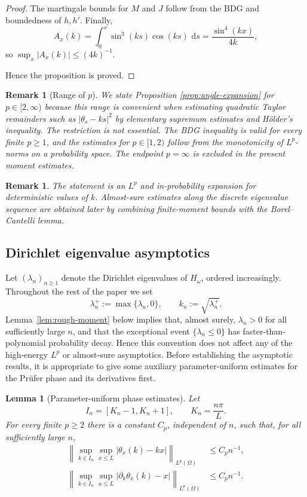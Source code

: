 \documentclass[11pt]{article}
\newtheorem{lemma}[theorem]{Lemma}
\newtheorem{remark}[theorem]{Remark}
\newcommand{\dd}{\,\mathrm d}
\begin{document}
\begin{proof}
The martingale bounds for $M$ and $J$ follow from the BDG and boundedness of $h,h'$.
Finally,
\[
    A_x(k)=\int_0^x\sin^3(ks)\cos(ks)\,\dd s
    =\frac{\sin^4(kx)}{4k},
\]
so $\sup_x|A_x(k)|\le(4k)^{-1}$. 

Hence the proposition is proved.
\end{proof}

\begin{remark}[Range of $p$]\label{rem:p-range}
We state Proposition \ref{prop:angle-expansion} for $p\in[2,\infty)$ because this range is convenient when estimating quadratic Taylor remainders such as $|\theta_s-ks|^2$ by elementary supremum estimates and H\"older's inequality. The restriction is not essential. The BDG inequality is valid for every finite $p\ge1$, and the estimates for $p\in[1,2)$ follow from the monotonicity of $L^p$-norms on a probability space. The endpoint $p=\infty$ is excluded in the present moment estimates.
\end{remark}

\begin{remark}
The statement is an $L^p$ and in-probability expansion for deterministic values of $k$. Almost-sure estimates along the discrete eigenvalue sequence are obtained later by combining finite-moment bounds with the Borel--Cantelli lemma.
\end{remark}

\subsection{Dirichlet eigenvalue asymptotics}

Let $(\lambda_n)_{n\ge1}$ denote the Dirichlet eigenvalues of $H_{\omega}$, ordered increasingly. Throughout the rest of the paper we set
\[
    \lambda_n^+:=\max\{\lambda_n,0\},
    \qquad
    k_n:=\sqrt{\lambda_n^+}.
\]
Lemma~\ref{lem:rough-moment} below implies that, almost surely, $\lambda_n>0$ for all sufficiently large $n$, and that the exceptional event $\{\lambda_n\le0\}$ has faster-than-polynomial probability decay. Hence this convention does not affect any of the high-energy $L^p$ or almost-sure asymptotics. Before establishing the asymptotic results, it is appropriate to give some auxiliary parameter-uniform estimates for the Pr\"ufer phase and its derivatives first.



\begin{lemma}[Parameter-uniform phase estimates]\label{lem:phase-uniform}
Let
\[
    I_n=[K_n-1,K_n+1],\qquad K_n=\frac{n\pi}{L}.
\]
For every finite $p\ge2$ there is a constant $C_p$, independent of $n$, such that, for all sufficiently large $n$,
\begin{align*}
    \left\|\sup_{k\in I_n}\sup_{x\le L}|\theta_x(k)-kx|\right\|_{L^p(\Omega)}
    &\le C_p n^{-1},\\
    \left\|\sup_{k\in I_n}\sup_{x\le L}|\partial_k\theta_x(k)-x|\right\|_{L^p(\Omega)}
    &\le C_p n^{-1}.
\end{align*}
\end{lemma}
\end{document}
